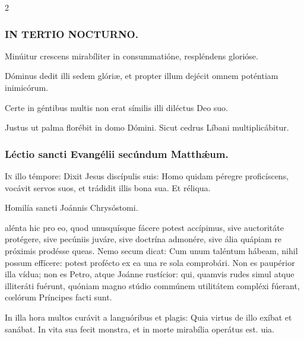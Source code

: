 \documentclass[9pt,twoside]{extarticle}
\begin{document}
\begin{multicols}{2}
\subsubsection*{\center \textsc{IN TERTIO NOCTURNO.}}
\begin{tightlist}{}
\item {} Minúitur crescens mirabíliter in consummatióne, respléndens glorióse.
\item {} Dóminus dedit illi sedem glóriæ, et propter illum dejécit omnem poténtiam inimicórum.
\item {} Certe in géntibus multis non erat símilis illi diléctus Deo suo.
\item {} Justus ut palma florébit in domo Dómini.  Sicut cedrus Líbani multiplicábitur.
\end{tightlist}

\subsubsection*{\center Léctio sancti Evangélii secúndum Matthǽum.}
\begin{center} \hfill {}\end{center}
\lettrine{I}n illo témpore: Dixit Jesus discípulis suis: Homo quidam péregre proficíscens, vocávit servos suos, et trádidit illis bona sua. Et réliqua.

\begin{center}Homilía sancti Joánnis Chrysóstomi.\\
\end{center}
alénta hic pro eo, quod unusquísque fácere potest accípimus, sive auctoritáte protégere, sive pecúniis juváre, sive doctrína admonére, sive ália quápiam re próximis prodésse queas. Nemo secum dicat: Cum unum taléntum hábeam, nihil possum effícere: potest profécto ex ea una re sola comprobári. Non es paupérior illa vídua; non es Petro, atque Joánne rustícior: qui, quamvis rudes simul atque illiteráti fuérunt, quóniam magno stúdio commúnem utilitátem compléxi fúerant, cœlórum Príncipes facti sunt.

\begin{tightlist}{}
\item {} In illa hora multos curávit a languóribus et plagis: \textred{*} Quia virtus de illo exíbat et sanábat.  In vita sua fecit monstra, et in morte mirabília operátus est. uia.
\end{tightlist}


\end{multicols}
\end{document}
